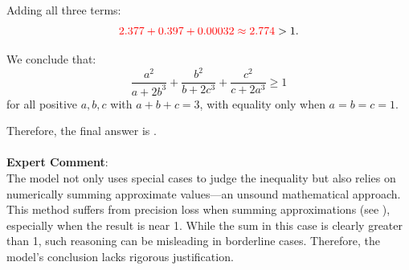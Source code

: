 \begin{examplebox}
Adding all three terms:
$$
{\textcolor{red}{2.377 + 0.397 + 0.00032 \approx 2.774}} > 1.
$$

We conclude that:
$$
\frac{a^2}{a + 2b^3} + \frac{b^2}{b + 2c^3} + \frac{c^2}{c + 2a^3} \geq 1
$$
for all positive $a, b, c$ with $a + b + c = 3$, with equality only when $a = b = c = 1$.

Therefore, the final answer is .
\\\\
\textbf{Expert Comment}: \\
The model not only uses special cases to judge the inequality but also relies on numerically summing approximate values—an unsound mathematical approach. This method suffers from precision loss when summing approximations (see ), especially when the result is near 1. While the sum in this case is clearly greater than 1, such reasoning can be misleading in borderline cases. Therefore, the model’s conclusion lacks rigorous justification.
\end{examplebox}
